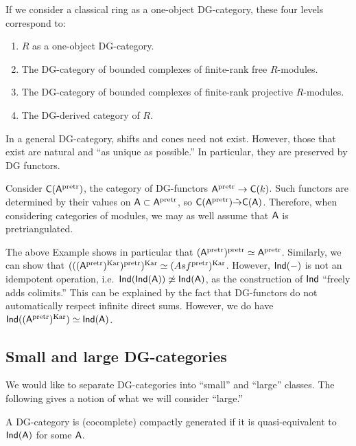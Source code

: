 \documentclass{amsart}
\begin{document}
If we consider a classical ring as a one-object DG-category, these four levels correspond to:
\begin{enumerate}
	\item $R$ as a one-object DG-category.
	\item The DG-category of bounded complexes of finite-rank free $R$-modules.
	\item The DG-category of bounded complexes of finite-rank projective $R$-modules.
	\item The DG-derived category of $R$.
\end{enumerate}

\begin{rmk}
	In a general DG-category, shifts and cones need not exist.
	However, those that exist are natural and ``as unique as possible.''
	In particular, they are preserved by DG functors.
\end{rmk}

\begin{ex}
	Consider $\mathsf{C}(\mathsf{A}^{\mathrm{pretr}})$, the category of DG-functors $\mathsf{A}^{\mathrm{pretr}} \to \mathsf{C}(k)$.
	Such functors are determined by their values on $\mathsf{A} \subset \mathsf{A}^{\mathrm{pretr}}$, so $\mathsf{C}(\mathsf{A}^{\mathrm{pretr}}) \tilde{\to} \mathsf{C}(\mathsf{A})$.
	Therefore, when considering categories of modules, we may as well assume that $\mathsf{A}$ is pretriangulated.
\end{ex}

The above Example shows in particular that $(\mathsf{A}^{\mathrm{pretr}})^{\mathrm{pretr}} \simeq \mathsf{A}^{\mathrm{pretr}}$.
Similarly, we can show that $(((\mathsf{A}^{\mathrm{pretr}})^{\mathrm{Kar}})^{\mathrm{pretr}})^{\mathrm{Kar}} \simeq (Asf^{\mathrm{pretr}})^{\mathrm{Kar}}$.
However, $\mathsf{Ind}(-)$ is not an idempotent operation, i.e.\ $\mathsf{Ind}(\mathsf{Ind}(\mathsf{A})) \not\simeq \mathsf{Ind}(\mathsf{A})$, as the construction of $\mathsf{Ind}$ ``freely adds colimits.''
This can be explained by the fact that DG-functors do not automatically respect infinite direct sums.
However, we do have $\mathsf{Ind}((\mathsf{A}^{\mathrm{pretr}})^{\mathrm{Kar}}) \simeq \mathsf{Ind}(\mathsf{A})$.

\subsection{Small and large DG-categories}

We would like to separate DG-categories into ``small'' and ``large'' classes.
The following gives a notion of what we will consider ``large.''

\begin{dfn}
	A DG-category is (cocomplete) compactly generated if it is quasi-equivalent to $\mathsf{Ind}(\mathsf{A})$ for some $\mathsf{A}$.
\end{dfn}
\end{document}
